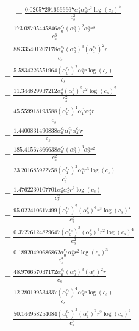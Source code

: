 \documentclass[10pt]{article}
\begin{document}
\begin{align*}
\phantom{R_{3,9}} &\phantom{={}}{}  - \frac{0.020572916666667 \alpha_{1}^s \alpha_{4}^s r^{2} \log{\left(c_{s} \right)}^{5}}{c_{s}^{2}} \\
&{}  - \frac{173.08705445846 \alpha_{0}^{c_s} \left(\alpha_{0}^s\right)^{2} \alpha_{2}^s r^{3}}{c_{s}^{3}} \\
&{}  - \frac{88.335401207178 \alpha_{0}^{c_s} \left(\alpha_{0}^s\right)^{3} \left(\alpha_{1}^{c_s}\right)^{2} r}{c_{s}} \\
&{}  - \frac{5.5834226551964 \left(\alpha_{0}^{c_s}\right)^{2} \alpha_{5}^s r \log{\left(c_{s} \right)}}{c_{s}} \\
&{}  - \frac{11.344829937212 \alpha_{0}^s \left(\alpha_{2}^s\right)^{2} r^{2} \log{\left(c_{s} \right)}^{2}}{c_{s}^{2}} \\
&{}  - \frac{45.559918193588 \left(\alpha_{0}^{c_s}\right)^{4} \alpha_{1}^{c_s} \alpha_{1}^s r}{c_{s}} \\
&{}  - \frac{1.4400831490838 \alpha_{0}^{c_s} \alpha_{1}^{c_s} \alpha_{4}^{c_s} r}{c_{s}} \\
&{}  - \frac{185.41567366638 \alpha_{0}^{c_s} \left(\alpha_{0}^s\right)^{3} \alpha_{2}^s r^{2}}{c_{s}^{2}} \\
&{}  - \frac{23.201685922758 \left(\alpha_{1}^{c_s}\right)^{2} \alpha_{1}^s r^{3} \log{\left(c_{s} \right)}}{c_{s}^{3}} \\
&{}  - \frac{1.4762230107701 \alpha_{0}^s \alpha_{5}^s r^{2} \log{\left(c_{s} \right)}}{c_{s}^{2}} \\
&{}  - \frac{95.022410617499 \left(\alpha_{0}^{c_s}\right)^{2} \left(\alpha_{0}^s\right)^{4} r^{3} \log{\left(c_{s} \right)}^{2}}{c_{s}^{3}} \\
&{}  - \frac{0.37276124829647 \left(\alpha_{0}^{c_s}\right)^{3} \left(\alpha_{0}^s\right)^{4} r^{2} \log{\left(c_{s} \right)}^{4}}{c_{s}^{2}} \\
&{}  - \frac{0.18920490686862 \alpha_{0}^{c_s} \alpha_{5}^s r^{2} \log{\left(c_{s} \right)}^{3}}{c_{s}^{2}} \\
&{}  - \frac{48.976657037172 \alpha_{0}^{c_s} \left(\alpha_{0}^s\right)^{3} \left(\alpha_{1}^s\right)^{2} r}{c_{s}} \\
&{}  - \frac{12.280199534337 \left(\alpha_{0}^{c_s}\right)^{4} \alpha_{3}^s r \log{\left(c_{s} \right)}}{c_{s}} \\
&{}  - \frac{50.144958254084 \left(\alpha_{0}^{c_s}\right)^{3} \left(\alpha_{1}^s\right)^{2} r^{2} \log{\left(c_{s} \right)}^{2}}{c_{s}^{2}} \\

\end{align*}
\end{document}
